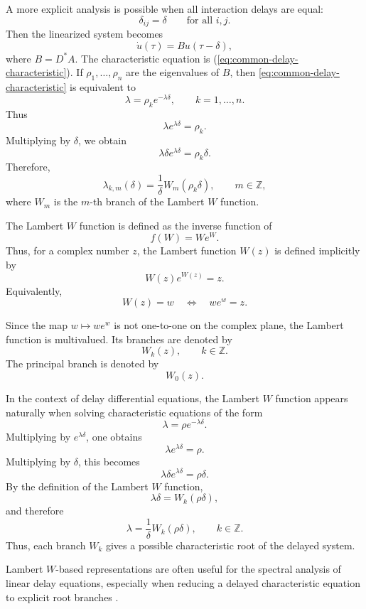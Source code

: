 \documentclass[11pt]{article}
\def\eq#1{(\ref{#1})}
\begin{document}
 A more explicit analysis is possible when all interaction delays are equal:
 \[
 \delta_{ij}=\delta
 \qquad
 \text{for all } i,j.
 \]
 Then the linearized system becomes
 \begin{equation}
 \label{eq:common-delay-linearized}
 \dot{u}(\tau)=B u(\tau-\delta),
 \end{equation}
 where $B=D^\ast A$. The characteristic equation is \eq{eq:common-delay-characteristic}.
 If $\rho_1,\ldots,\rho_n$ are the eigenvalues of $B$, then
 \eqref{eq:common-delay-characteristic} is equivalent to
 \begin{equation}
 \label{eq:scalar-characteristic-rho}
 \lambda=\rho_k e^{-\lambda\delta},
 \qquad k=1,\ldots,n.
 \end{equation}
 Thus
 \[
 \lambda e^{\lambda\delta}=\rho_k.
 \]
 Multiplying by $\delta$, we obtain
 \[
 \lambda\delta e^{\lambda\delta}=\rho_k\delta.
 \]
 Therefore,
 \begin{equation}
 \label{eq:lambda-lambert}
 \lambda_{k,m}(\delta)
 =
 \frac{1}{\delta}
 W_m(\rho_k\delta),
 \qquad
 m\in\mathbb{Z},
 \end{equation}
 where $W_m$ is the $m$-th branch of the Lambert $W$ function. 

 The Lambert \(W\) function is defined as the inverse function of
 \[
 f(W)=W e^{W}.
 \]
 Thus, for a complex number \(z\), the Lambert function \(W(z)\) is defined implicitly by
 \[
 W(z)e^{W(z)}=z.
 \]
 Equivalently,
 \[
 W(z)=w
 \quad \Longleftrightarrow \quad
 w e^w=z.
 \]
 
 Since the map \(w\mapsto we^w\) is not one-to-one on the complex plane, the Lambert function is multivalued. Its branches are denoted by
 \[
 W_k(z), \qquad k\in\mathbb{Z}.
 \]
 The principal branch is denoted by
 \[
 W_0(z).
 \]
 
 In the context of delay differential equations, the Lambert \(W\) function appears naturally when solving characteristic equations of the form
 \[
 \lambda=\rho e^{-\lambda\delta}.
 \]
 Multiplying by \(e^{\lambda\delta}\), one obtains
 \[
 \lambda e^{\lambda\delta}=\rho.
 \]
 Multiplying by \(\delta\), this becomes
 \[
 \lambda\delta e^{\lambda\delta}=\rho\delta.
 \]
 By the definition of the Lambert \(W\) function,
 \[
 \lambda\delta = W_k(\rho\delta),
 \]
 and therefore
 \[
 \lambda=\frac{1}{\delta}W_k(\rho\delta),
 \qquad k\in\mathbb{Z}.
 \]
 Thus, each branch \(W_k\) gives a possible characteristic root of the delayed system.
 
 
 Lambert
 \(W\)-based representations are often useful for the spectral analysis of
 linear delay equations, especially when reducing a delayed characteristic
 equation to explicit root branches \cite{ruzgas2024lambert}.
 
\end{document}

